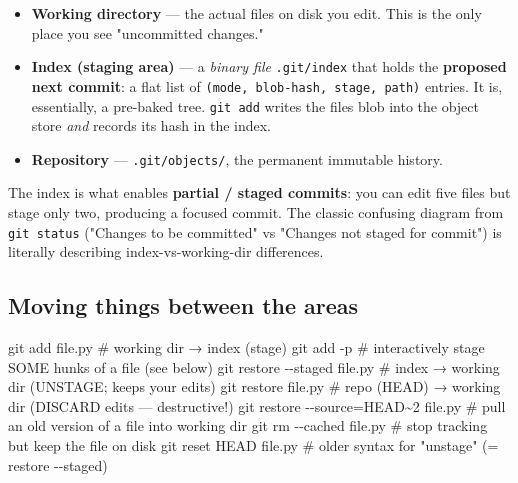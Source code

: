 \documentclass[11pt]{article}
\providecommand{\tightlist}{\setlength{\itemsep}{1pt}\setlength{\parskip}{0pt}}
\newenvironment{Shaded}{\begin{snugshade}}{\end{snugshade}}
\newcommand{\AttributeTok}[1]{\textcolor[rgb]{0.16,0.50,0.73}{#1}}
\newcommand{\CommentTok}[1]{\textcolor[rgb]{0.48,0.49,0.49}{#1}}
\newcommand{\FunctionTok}[1]{\textcolor[rgb]{0.56,0.27,0.68}{#1}}
\newcommand{\NormalTok}[1]{\textcolor[rgb]{0.81,0.81,0.76}{#1}}
\newcommand{\OperatorTok}[1]{\textcolor[rgb]{0.81,0.81,0.76}{#1}}
\begin{document}
\begin{itemize}
\tightlist
\item
  \textbf{Working directory} --- the actual files on disk you edit. This is the only place you see "uncommitted changes."
\item
  \textbf{Index (staging area)} --- a \emph{binary file} \texttt{.git/index} that holds the \textbf{proposed next commit}: a flat list of \texttt{(mode,\ blob-hash,\ stage,\ path)} entries. It is, essentially, a pre-baked tree. \texttt{git\ add} writes the file\textquotesingle s blob into the object store \emph{and} records its hash in the index.
\item
  \textbf{Repository} --- \texttt{.git/objects/}, the permanent immutable history.
\end{itemize}

The index is what enables \textbf{partial / staged commits}: you can edit five files but stage only two, producing a focused commit. The classic confusing diagram from \texttt{git\ status} ("Changes to be committed" vs "Changes not staged for commit") is literally describing index-vs-working-dir differences.

\subsection{Moving things between the areas}\label{moving-things-between-the-areas}


\begin{Shaded}
\begin{Highlighting}[]
\FunctionTok{git}\NormalTok{ add file.py              }\CommentTok{\# working dir → index (stage)}
\FunctionTok{git}\NormalTok{ add }\AttributeTok{{-}p}                   \CommentTok{\# interactively stage SOME hunks of a file (see below)}
\FunctionTok{git}\NormalTok{ restore }\AttributeTok{{-}{-}staged}\NormalTok{ file.py }\CommentTok{\# index → working dir  (UNSTAGE; keeps your edits)}
\FunctionTok{git}\NormalTok{ restore file.py          }\CommentTok{\# repo (HEAD) → working dir (DISCARD edits — destructive!)}
\FunctionTok{git}\NormalTok{ restore }\AttributeTok{{-}{-}source}\OperatorTok{=}\NormalTok{HEAD\textasciitilde{}2 file.py   }\CommentTok{\# pull an old version of a file into working dir}
\FunctionTok{git}\NormalTok{ rm }\AttributeTok{{-}{-}cached}\NormalTok{ file.py      }\CommentTok{\# stop tracking but keep the file on disk}
\FunctionTok{git}\NormalTok{ reset HEAD file.py       }\CommentTok{\# older syntax for "unstage" (= restore {-}{-}staged)}
\end{Highlighting}
\end{Shaded}
\end{document}
